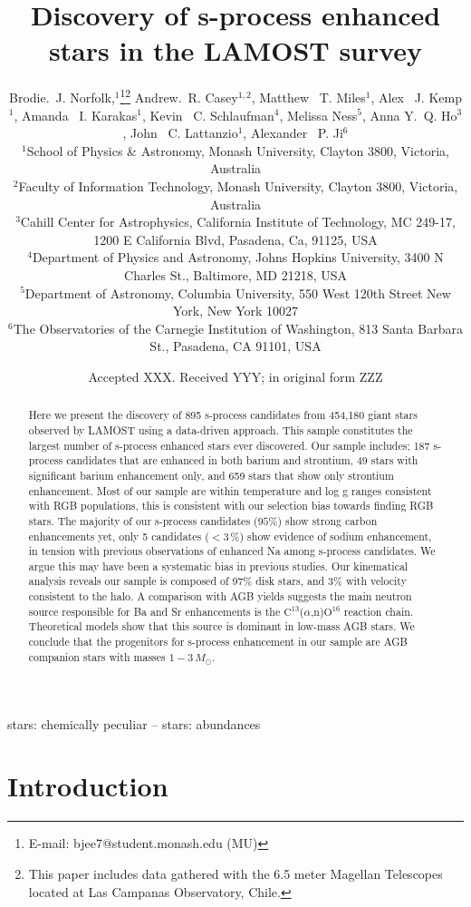 \documentclass[a4paper,fleqn,usenatbib]{mnras}
\title[S-process stars in LAMOST]{Discovery of s-process enhanced stars in the LAMOST survey}
\author[Brodie.~J. Norfolk et al.]{Brodie.~J. Norfolk,$^{1}$\thanks{E-mail: bjee7@student.monash.edu (MU)}\thanks{This paper includes data gathered with the 6.5 meter Magellan Telescopes located at Las Campanas Observatory, Chile.}
Andrew.~R. Casey$^{1,2}$,
Matthew ~T. Miles$^{1}$,
Alex ~J. Kemp$^{1}$, \newauthor
Amanda ~I. Karakas$^{1}$,
Kevin ~C. Schlaufman$^{4}$,
Melissa Ness$^{5}$,
Anna Y.~Q. Ho$^{3}$, \newauthor
John ~C. Lattanzio$^{1}$, 
Alexander ~P. Ji$^{6}$
\\
$^{1}$School of Physics \& Astronomy, Monash University, Clayton 3800, Victoria, Australia\\
$^{2}$Faculty of Information Technology, Monash University, Clayton 3800, Victoria, Australia\\
$^{3}$Cahill Center for Astrophysics, California Institute of Technology, MC 249-17, 1200 E California Blvd, Pasadena, Ca, 91125, USA\\
$^{4}$Department of Physics and Astronomy, Johns Hopkins University, 3400 N Charles St., Baltimore, MD 21218, USA
\\
$^{5}$Department of Astronomy, Columbia University, 550 West 120th Street New York, New York 10027
\\
$^{6}$The Observatories of the Carnegie Institution of Washington, 813 Santa Barbara St., Pasadena, CA 91101, USA
}
\date{Accepted XXX. Received YYY; in original form ZZZ}
\begin{document}
\label{firstpage}
\pagerange{\pageref{firstpage}--\pageref{lastpage}}
\maketitle

\begin{abstract}

Here we present the discovery of 895 s-process candidates from 454,180 giant stars observed by LAMOST using a data-driven approach. This sample constitutes the largest number of s-process enhanced stars ever discovered. Our sample includes; 187 s-process candidates that are enhanced in both barium and strontium, 49 stars with significant barium enhancement only, and 659 stars that show only strontium enhancement. Most of our sample are within temperature and log g ranges consistent with RGB populations, this is consistent with our selection bias towards finding RGB stars. The majority of our s-process candidates ($95\%$) show strong carbon enhancements yet, only 5 candidates ($<3$\,\%) show evidence of sodium enhancement, in tension with previous observations of enhanced Na among s-process candidates. We argue this may have been a systematic bias in previous studies. Our kinematical analysis reveals our sample is composed of 97\% disk stars, and 3\% with velocity consistent to the halo. A comparison with AGB yields suggests the main neutron source responsible for Ba and Sr enhancements is the $\text{C}^{13}$(\textrm{$\alpha$},n)$\text{O}^{16}$ reaction chain. Theoretical models show that this source is dominant in low-mass AGB stars. We conclude that the progenitors for s-process enhancement in our sample are AGB companion stars with masses $1 - 3\,M_{\odot}$. 

\end{abstract}

\begin{keywords}
stars: chemically peculiar -- stars: abundances
\end{keywords}

\section{Introduction} \label{sec:intro}
\end{document}
